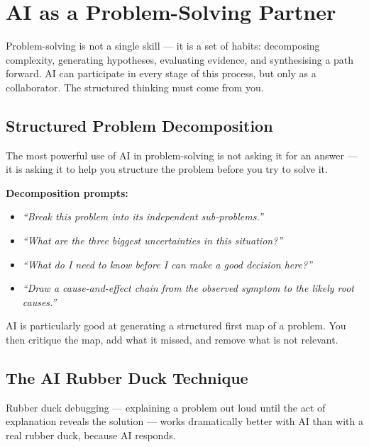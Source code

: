 \chapter{AI as a Problem-Solving Partner}
\label{ch:problem-solving}

Problem-solving is not a single skill --- it is a set of habits: decomposing complexity,
generating hypotheses, evaluating evidence, and synthesising a path forward.
AI can participate in every stage of this process, but only as a collaborator.
The structured thinking must come from you.

\section{Structured Problem Decomposition}
\label{sec:decomposition}

The most powerful use of AI in problem-solving is not asking it for an answer ---
it is asking it to help you structure the problem before you try to solve it.

\textbf{Decomposition prompts:}
\begin{itemize}
  \item \textit{``Break this problem into its independent sub-problems.''}
  \item \textit{``What are the three biggest uncertainties in this situation?''}
  \item \textit{``What do I need to know before I can make a good decision here?''}
  \item \textit{``Draw a cause-and-effect chain from the observed symptom to the likely root causes.''}
\end{itemize}

AI is particularly good at generating a structured first map of a problem.
You then critique the map, add what it missed, and remove what is not relevant.

\section{The AI Rubber Duck Technique}
\label{sec:rubberduck}

Rubber duck debugging --- explaining a problem out loud until the act of explanation
reveals the solution --- works dramatically better with AI than with a real rubber duck,
because AI responds.

